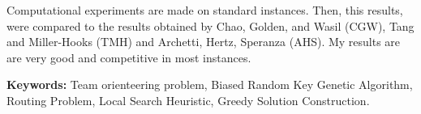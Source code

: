 \bigskip

Computational experiments are made on standard instances. Then, this results, were compared to the results obtained by Chao, Golden, and Wasil \cite{ChaoGoldenWasil} (CGW), Tang and Miller-Hooks \cite{TangMillerHooks} (TMH) and Archetti, Hertz, Speranza \cite{ArchettiHertzSperanza} (AHS). My results are are very good and competitive in most instances.

\bigskip

\noindent\textbf{Keywords:} Team orienteering problem, Biased Random Key Genetic Algorithm, Routing Problem, Local Search Heuristic, Greedy Solution Construction.